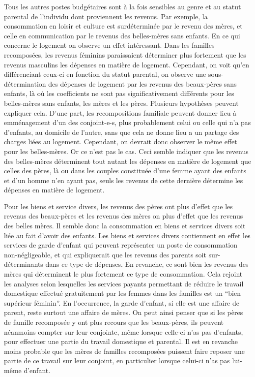\documentclass[
  12pt,
]{book}
\begin{document}
Tous les autres postes budgétaires sont à la fois sensibles au genre et
au statut parental de l'individu dont proviennent les revenus. Par
exemple, la consommation en loisir et culture est surdéterminée par le
revenu des mères, et celle en communication par le revenus des
belles-mères sans enfants. En ce qui concerne le logement on observe un
effet intéressant. Dans les familles recomposées, les revenus féminins
paraissaient déterminer plus fortement que les revenus masculins les
dépenses en matière de logement. Cependant, on voit qu'en différenciant
ceux-ci en fonction du statut parental, on observe une
sous-détermination des dépenses de logement par les revenus des
beaux-pères sans enfants, là où les coefficients ne sont pas
significativement différents pour les belles-mères sans enfants, les
mères et les pères. Plusieurs hypothèses peuvent expliquer cela. D'une
part, les recompositions familiale peuvent donner lieu à emménagement
d'un des conjoint-e-s, plus probablement celui ou celle qui n'a pas
d'enfants, au domicile de l'autre, sans que cela ne donne lieu a un
partage des charges liées au logement. Cependant, on devrait donc
observer le même effet pour les belles-mères. Or ce n'est pas le cas.
Ceci semble indiquer que les revenus des belles-mères déterminent tout
autant les dépenses en matière de logement que celles des pères, là ou
dans les couples constituée d'une femme ayant des enfants et d'un homme
n'en ayant pas, seuls les revenus de cette dernière détermine les
dépenses en matière de logement.

Pour les biens et service divers, les revenus des pères ont plus d'effet
que les revenus des beaux-pères et les revenus des mères on plus d'effet
que les revenus des belles mères. Il semble donc la consommation en
biens et services divers soit liée au fait d'avoir des enfants. Les
biens et services divers contiennent en effet les services de garde
d'enfant qui peuvent représenter un poste de consommation
non-négligeable, et qui expliquerait que les revenus des parents soit
sur-déterminants dans ce type de dépenses. En revanche, ce sont bien les
revenus des mères qui déterminent le plus fortement ce type de
consommation. Cela rejoint les analyses selon lesquelles les services
payants permettant de réduire le travail domestique effectué
gratuitement par les femmes dans les familles est un ``bien supérieur
féminin''. En l'occurrence, la garde d'enfant, si elle est une affaire
de parent, reste surtout une affaire de mères. On peut ainsi penser que
si les pères de famille recomposée y ont plus recours que les
beaux-pères, ils peuvent néanmoins compter sur leur conjointe, même
lorsque celle-ci n'as pas d'enfants, pour effectuer une partie du
travail domestique et parental. Il est en revanche moins probable que
les mères de familles recomposées puissent faire reposer une partie de
ce travail sur leur conjoint, en particulier lorsque celui-ci n'as pas
lui-même d'enfant.
\end{document}
